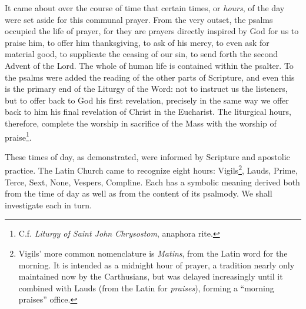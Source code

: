 		It came about over the course of time that certain times, or \textit{hours}, of the day were set aside for this communal prayer. From the very outset, the psalms occupied the life of prayer, for they are prayers directly inspired by God for us to praise him, to offer him thanksgiving, to ask of his mercy, to even ask for material good, to supplicate the ceasing of our sin, to send forth the second Advent of the Lord. The whole of human life is contained within the psalter. To the psalms were added the reading of the other parts of Scripture, and even this is the primary end of the Liturgy of the Word: not to instruct us the listeners, but to offer back to God his first revelation, precisely in the same way we offer back to him his final revelation of Christ in the Eucharist. The liturgical hours, therefore, complete the worship in sacrifice of the Mass with the worship of praise\footnote{C.f. \textit{Liturgy of Saint John Chrysostom}, anaphora rite.}.
		
		These times of day, as demonstrated, were informed by Scripture and apostolic practice. The Latin Church came to recognize eight hours: Vigils\footnote{Vigils' more common nomenclature is \textit{Matins}, from the Latin word for the morning. It is intended as a midnight hour of prayer, a tradition nearly only maintained now by the Carthusians, but was delayed increasingly until it combined with Lauds (from the Latin for \textit{praises}), forming a \enquote{morning praises} office.}, Lauds, Prime, Terce, Sext, None, Vespers, Compline. Each has a symbolic meaning derived both from the time of day as well as from the content of its psalmody. We shall investigate each in turn.
		
